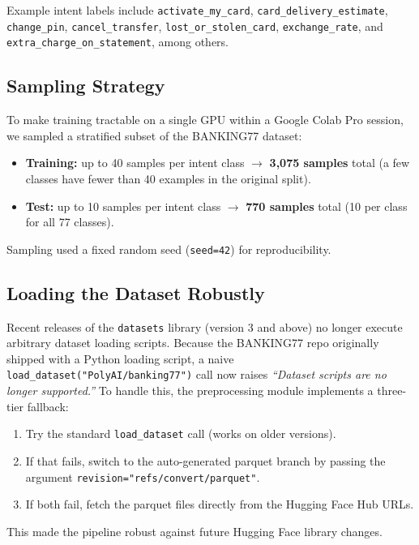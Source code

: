 \documentclass[12pt,a4paper]{article}
\begin{document}
Example intent labels include
\texttt{activate\_my\_card}, \texttt{card\_delivery\_estimate},
\texttt{change\_pin}, \texttt{cancel\_transfer},
\texttt{lost\_or\_stolen\_card}, \texttt{exchange\_rate}, and
\texttt{extra\_charge\_on\_statement}, among others.

\subsection{Sampling Strategy}

To make training tractable on a single GPU within a Google Colab Pro session,
we sampled a stratified subset of the BANKING77 dataset:
\begin{itemize}[noitemsep]
    \item \textbf{Training:} up to 40 samples per intent class
          $\rightarrow$ \textbf{3{,}075 samples} total
          (a few classes have fewer than 40 examples in the original split).
    \item \textbf{Test:} up to 10 samples per intent class
          $\rightarrow$ \textbf{770 samples} total (10 per class for all 77 classes).
\end{itemize}
Sampling used a fixed random seed (\texttt{seed=42}) for reproducibility.

\subsection{Loading the Dataset Robustly}

Recent releases of the \texttt{datasets} library (version 3 and above) no
longer execute arbitrary dataset loading scripts. Because the BANKING77 repo
originally shipped with a Python loading script, a naive
\texttt{load\_dataset("PolyAI/banking77")} call now raises
\textit{``Dataset scripts are no longer supported.''} To handle this, the
preprocessing module implements a three-tier fallback:
\begin{enumerate}[noitemsep]
    \item Try the standard \texttt{load\_dataset} call (works on older versions).
    \item If that fails, switch to the auto-generated parquet branch by
          passing the argument
          \texttt{revision="refs/\allowbreak convert/\allowbreak parquet"}.
    \item If both fail, fetch the parquet files directly from the Hugging Face
          Hub URLs.
\end{enumerate}
This made the pipeline robust against future Hugging Face library changes.
\end{document}
